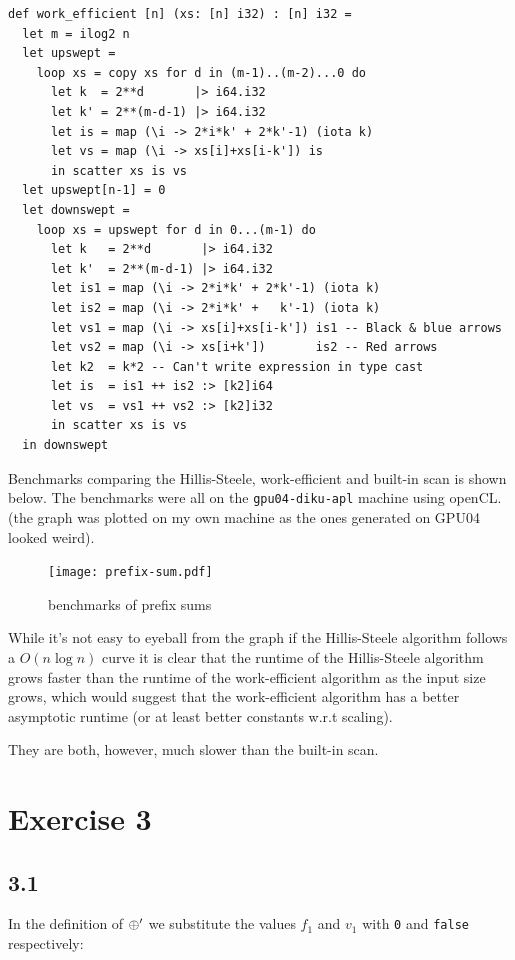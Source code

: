 \documentclass{article}
\begin{document}
\begin{verbatim}
def work_efficient [n] (xs: [n] i32) : [n] i32 =
  let m = ilog2 n
  let upswept =
    loop xs = copy xs for d in (m-1)..(m-2)...0 do
      let k  = 2**d       |> i64.i32
      let k' = 2**(m-d-1) |> i64.i32
      let is = map (\i -> 2*i*k' + 2*k'-1) (iota k)
      let vs = map (\i -> xs[i]+xs[i-k']) is
      in scatter xs is vs
  let upswept[n-1] = 0
  let downswept =
    loop xs = upswept for d in 0...(m-1) do
      let k   = 2**d       |> i64.i32
      let k'  = 2**(m-d-1) |> i64.i32
      let is1 = map (\i -> 2*i*k' + 2*k'-1) (iota k)
      let is2 = map (\i -> 2*i*k' +   k'-1) (iota k)
      let vs1 = map (\i -> xs[i]+xs[i-k']) is1 -- Black & blue arrows
      let vs2 = map (\i -> xs[i+k'])       is2 -- Red arrows
      let k2  = k*2 -- Can't write expression in type cast
      let is  = is1 ++ is2 :> [k2]i64
      let vs  = vs1 ++ vs2 :> [k2]i32
      in scatter xs is vs
  in downswept
\end{verbatim}

Benchmarks comparing the Hillis-Steele, work-efficient and built-in scan is
shown below. The benchmarks were all on the \verb|gpu04-diku-apl| machine using
openCL. (the graph was plotted on my own machine as the ones generated on GPU04
looked weird).

\begin{figure}
    \centering
    \texttt{[image: prefix-sum.pdf]}
    \caption{benchmarks of prefix sums}
\end{figure}

While it's not easy to eyeball from the graph if the Hillis-Steele algorithm
follows a $O( n \log n)$ curve it is clear that the runtime of the Hillis-Steele
algorithm grows faster than the runtime of the work-efficient algorithm as the
input size grows, which would suggest that the work-efficient algorithm has a
better asymptotic runtime (or at least better constants w.r.t scaling).

They are both, however, much slower than the built-in scan.


\section*{Exercise 3}

\subsection*{3.1}

In the definition of $\oplus'$ we substitute the values $f_1$ and $v_1$ with
\verb|0| and \verb|false| respectively:
\end{document}
